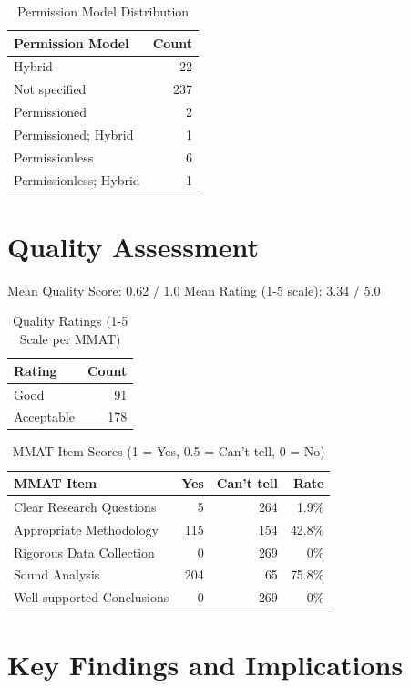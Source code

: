 \documentclass{article}
\begin{document}
\begin{table}[htbp]
\centering
\caption{Permission Model Distribution}
\begin{tabular}{lr}
\toprule
Permission Model & Count \\
\midrule
Hybrid & 22 \\
Not specified & 237 \\
Permissioned & 2 \\
Permissioned; Hybrid & 1 \\
Permissionless & 6 \\
Permissionless; Hybrid & 1 \\
\bottomrule
\end{tabular}
\end{table}

\section{Quality Assessment}

Mean Quality Score: 0.62 / 1.0
Mean Rating (1-5 scale): 3.34 / 5.0

\begin{table}[htbp]
\centering
\caption{Quality Ratings (1-5 Scale per MMAT)}
\begin{tabular}{lr}
\toprule
Rating & Count \\
\midrule
Good & 91 \\
Acceptable & 178 \\
\bottomrule
\end{tabular}
\end{table}

\begin{table}[htbp]
\centering
\caption{MMAT Item Scores (1 = Yes, 0.5 = Can't tell, 0 = No)}
\begin{tabular}{lrrr}
\toprule
MMAT Item & Yes & Can't tell & Rate \\
\midrule
Clear Research Questions & 5 & 264 & 1.9\% \\
Appropriate Methodology & 115 & 154 & 42.8\% \\
Rigorous Data Collection & 0 & 269 & 0\% \\
Sound Analysis & 204 & 65 & 75.8\% \\
Well-supported Conclusions & 0 & 269 & 0\% \\
\bottomrule
\end{tabular}
\end{table}

\section{Key Findings and Implications}
\end{document}

